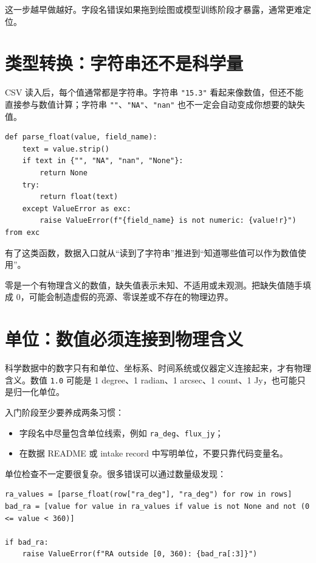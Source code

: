 这一步越早做越好。字段名错误如果拖到绘图或模型训练阶段才暴露，通常更难定位。

\section{类型转换：字符串还不是科学量}

CSV 读入后，每个值通常都是字符串。字符串 \texttt{"15.3"} 看起来像数值，但还不能直接参与数值计算；字符串 \texttt{""}、\texttt{"NA"}、\texttt{"nan"} 也不一定会自动变成你想要的缺失值。

\begin{examplebox}[最小数值解析函数]
\begin{lstlisting}[style=pythonstyle]
def parse_float(value, field_name):
    text = value.strip()
    if text in {"", "NA", "nan", "None"}:
        return None
    try:
        return float(text)
    except ValueError as exc:
        raise ValueError(f"{field_name} is not numeric: {value!r}") from exc
\end{lstlisting}
\end{examplebox}

有了这类函数，数据入口就从“读到了字符串”推进到“知道哪些值可以作为数值使用”。

\begin{warnbox}[不要把缺失值自动填成零]
零是一个有物理含义的数值，缺失值表示未知、不适用或未观测。把缺失值随手填成 0，可能会制造虚假的亮源、零误差或不存在的物理边界。
\end{warnbox}

\section{单位：数值必须连接到物理含义}

科学数据中的数字只有和单位、坐标系、时间系统或仪器定义连接起来，才有物理含义。数值 \texttt{1.0} 可能是 1 degree、1 radian、1 arcsec、1 count、1 Jy，也可能只是归一化单位。

入门阶段至少要养成两条习惯：

\begin{itemize}
    \item 字段名中尽量包含单位线索，例如 \texttt{ra\_deg}、\texttt{flux\_jy}；
    \item 在数据 README 或 intake record 中写明单位，不要只靠代码变量名。
\end{itemize}

单位检查不一定要很复杂。很多错误可以通过数量级发现：

\begin{examplebox}[最小范围检查]
\begin{lstlisting}[style=pythonstyle]
ra_values = [parse_float(row["ra_deg"], "ra_deg") for row in rows]
bad_ra = [value for value in ra_values if value is not None and not (0 <= value < 360)]

if bad_ra:
    raise ValueError(f"RA outside [0, 360): {bad_ra[:3]}")
\end{lstlisting}
\end{examplebox}


